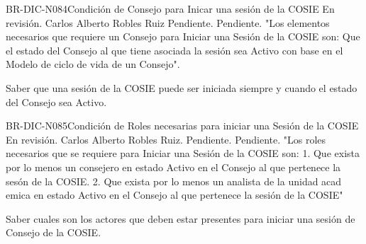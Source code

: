 \begin{BusinessRule}{BR-DIC-N084}{Condición de Consejo para Inicar una sesión de la COSIE}
	{\bcDerivation} %
	{\btTimer}     %
	{\blInfluencing}     %
	\BRItem[Estado] En revisión.
	 Carlos Alberto Robles Ruiz
	 Pendiente.
	 Pendiente.
	\BRItem[Descripción] "Los elementos necesarios que requiere un Consejo para Iniciar una Sesión de la COSIE son: 
Que el estado del Consejo al que tiene asociada la sesión sea Activo con base en el Modelo de ciclo de vida de un Consejo".
	\BRItem[Sentencia] \cdtEmpty
	
	\BRItem[Motivación] Saber que una sesión de la COSIE puede ser iniciada siempre y cuando el estado del Consejo sea Activo.
\end{BusinessRule}
\begin{BusinessRule}{BR-DIC-N085}{Condición de Roles necesarias para iniciar una Sesión de la COSIE}
	{\bcDerivation} %
	{\btTimer}     %
	{\blInfluencing}     %
	\BRItem[Estado] En revisión.
	 Carlos Alberto Robles Ruiz.
	 Pendiente.
	 Pendiente.
	\BRItem[Descripción] "Los roles necesarios que se requiere para Iniciar una Sesión de la COSIE son: 
1. Que exista por lo menos un consejero en estado Activo en el Consejo al que pertenece la sesón de la COSIE.
2. Que exista por lo menos un analista de la unidad acad emica en estado Activo en el Consejo al que pertenece la sesión de la COSIE"
	\BRItem[Sentencia] \cdtEmpty
	
	\BRItem[Motivación] Saber cuales son los actores que deben estar presentes para iniciar una sesión de Consejo de la COSIE.
\end{BusinessRule}

